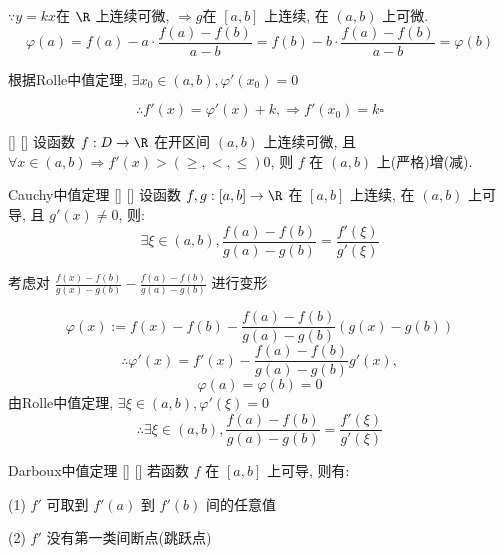 \documentclass[UTF8]{ctexart}
\begin{document}
				\(\because y=kx\)在 \(\R\) 上连续可微, \(\Longrightarrow g\)在 \([a,b]\) 上连续, 在 \((a,b)\) 上可微. 
				\[\varphi(a)=f(a)-a\cdot\frac{f(a)-f(b)}{a-b}=f(b)-b\cdot\frac{f(a)-f(b)}{a-b}=\varphi(b)\]
				
				根据Rolle中值定理, \(\exists x_0\in (a,b), \varphi'(x_0)=0\)
				
				\[\therefore f'(x)=\varphi'(x)+k, \Longrightarrow f'(x_0)=k\square\]
			
			\begin{crl}
				    []
				    {}
				    []
				    []
				设函数 \(f:D\to\R\) 在开区间 \((a,b)\) 上连续可微, 且 \(\forall x\in(a,b)\Longrightarrow f'(x)>(\geq,<,\leq)0\), 则 \(f\) 在 \((a,b)\) 上(严格)增(减). 
			\end{crl}

			\begin{thm}
			    []
			    {Cauchy中值定理}
			    []
			    []
				设函数 \(f,g:[a,b]\to\R\) 在 \([a,b]\) 上连续, 在 \((a,b)\) 上可导, 且 \(g'(x)\neq 0\), 则: 
				\[\exists\xi\in(a,b), \frac{f(a)-f(b)}{g(a)-g(b)}=\frac{f'(\xi)}{g'(\xi)}\]
			\end{thm}

			\begin{prf}
				考虑对 \(\frac{f(x)-f(b)}{g(x)-g(b)}-\frac{f(a)-f(b)}{g(a)-g(b)}\) 进行变形

				\[\varphi(x):=f(x)-f(b)-\frac{f(a)-f(b)}{g(a)-g(b)}(g(x)-g(b))\]
				\[\therefore\varphi'(x)=f'(x)-\frac{f(a)-f(b)}{g(a)-g(b)}g'(x),\]
				\[\varphi(a)=\varphi(b)=0\]
				由Rolle中值定理, \(\exists\xi\in(a,b), \varphi'(\xi)=0\)
				\[\therefore\exists\xi\in(a,b), \frac{f(a)-f(b)}{g(a)-g(b)}=\frac{f'(\xi)}{g'(\xi)}\]
			\end{prf}

            \begin{thm}
			    []
			    {Darboux中值定理}
			    []
			    []
				若函数 \(f\) 在 \([a,b]\) 上可导, 则有: 

				(1) \(f'\) 可取到 \(f'(a)\) 到 \(f'(b)\) 间的任意值

				(2) \(f'\) 没有第一类间断点(跳跃点)
			\end{thm}
\end{document}
